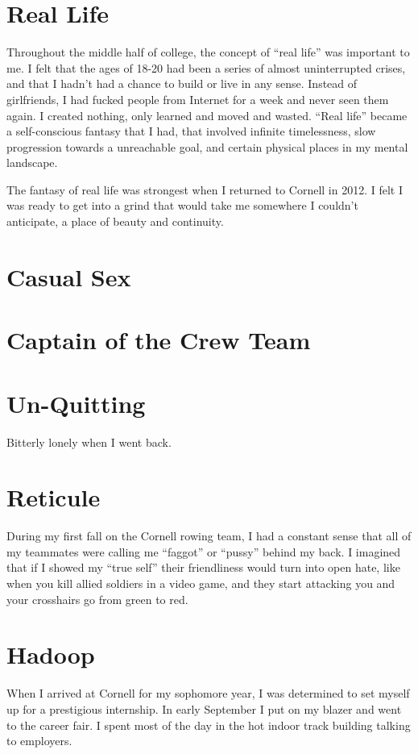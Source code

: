 \documentclass[12pt]{article}
\begin{document}
\section{Real Life}
Throughout the middle half of college, the concept of ``real life'' was
important to me.  I felt that the ages of 18-20 had been a series of almost
uninterrupted crises, and that I hadn't had a chance to build or live in any
sense.  Instead of girlfriends, I had fucked people from Internet for a week and
never seen them again.  I created nothing, only learned and moved and wasted.
``Real life'' became a self-conscious fantasy that I had, that involved infinite
timelessness, slow progression towards a unreachable goal, and certain physical
places in my mental landscape.

The fantasy of real life was strongest when I returned to Cornell in 2012.
I felt I was ready to get into a grind that would take me somewhere I couldn't
anticipate, a place of beauty and continuity.  

\section{Casual Sex}

\section{Captain of the Crew Team}

\section{Un-Quitting}
Bitterly lonely when I went back.

\section{Reticule}
During my first fall on the Cornell rowing team, I had a constant sense that
all of my teammates were calling me ``faggot'' or ``pussy'' behind my back.  I
imagined that if I showed my ``true self'' their friendliness would turn into
open hate, like when you kill allied soldiers in a video game, and they start
attacking you and your crosshairs go from green to red.  

\section{Hadoop}
When I arrived at Cornell for my sophomore year, I was determined to set myself
up for a prestigious internship.  In early September I put on my blazer and went
to the career fair.  I spent most of the day in the hot indoor track building
talking to employers. 
\end{document}
